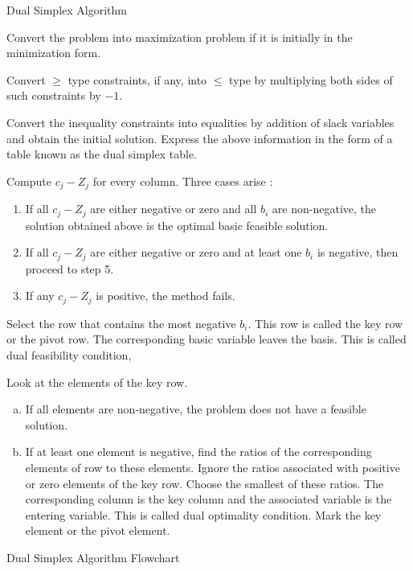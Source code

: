 \begin{frame}{Dual Simplex Algorithm}
  \begin{description} \justifying \parskip3mm
  \item<only@1>[Step 1.] \alert{Convert the problem into maximization problem} if it is initially in the minimization form.
  \item<only@1>[Step 2.] Convert $\geq$ type constraints, if any, into $\leq$ type by multiplying both sides of such
constraints by $-1$.
\item<only@1>[Step 3.] Convert the inequality constraints into equalities by addition of slack variables and obtain the initial solution. Express the above information in the form of a \alert{table known as the dual simplex table}.
\item<only@2>[Step 4.]  Compute $c_j - Z_j$ for every column. Three cases arise :
  \begin{enumerate} \justifying 
  \item  If all $c_j - Z_j$ are either negative or zero and all $b_i$ are non-negative, \alert{the solution obtained
above is the optimal basic feasible solution.}
\item If all $c_j - Z_j$ are either negative or zero and at least one $b_i$ is negative, then proceed to
step 5.
\item  If any $c_j - Z_j$ is positive, the method fails.
  \end{enumerate}
\item<only@2>[Step 5.]  Select the row that contains \alert{the most negative $b_i$}. This row is called the key row or
the pivot row. The corresponding basic variable leaves the basis. This is called dual feasibility
condition,
\item<only@3>[Step 6.]  Look at the elements of the key row.
  \begin{enumerate}[a)] \justifying
  \item  \alert{If all elements are non-negative, the problem does not have a feasible solution}.
  \item  \alert{If at least one element is negative}, find the ratios of the corresponding elements of row to these elements. \alert{Ignore the ratios associated with positive or zero elements of the key row}. Choose the smallest of these ratios. The corresponding column is the key column and the associated variable is the entering variable. This is called dual optimality condition. Mark the key element or the pivot element.
  \end{enumerate}
  \end{description}
\end{frame}

\begin{frame}{Dual Simplex Algorithm Flowchart}
\end{frame}

